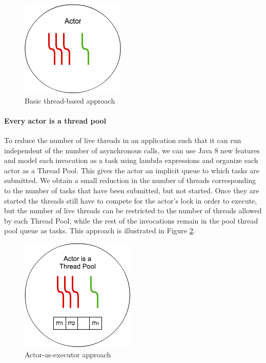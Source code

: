 \begin{figure}
	\label{tp}
	\centering
	\includegraphics[scale=0.5]{mt.png}
	\caption{Basic thread-based approach}
\end{figure}

\paragraph{Every actor is a thread pool}
To reduce the number of live threads in an application such that it can run independent of the number of asynchronous calls, we can use Java 8 new features and model each invocation as a task using lambda expressions and organize each actor as a Thread Pool. This gives the actor an implicit queue to which tasks are submitted. We obtain a small reduction in the number of threads corresponding to the number of tasks that have been submitted, but not started.  Once they are started the threads still have to compete for the actor's lock in order to execute, but the number of live threads can be restricted to the number of threads allowed by each Thread Pool, while the rest of the invocations remain in the pool thread pool queue as tasks. This approach is illustrated in Figure \ref{atp}. 


\begin{figure}
	\label{atp}
	\centering
	\includegraphics[scale=0.8]{atp.png}
	\caption{Actor-as-executor approach}
\end{figure}

